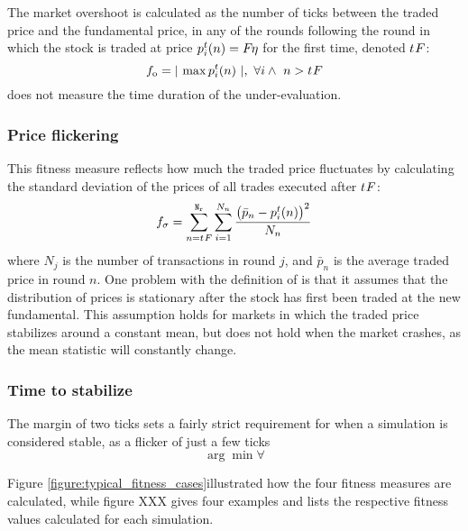 The market overshoot is calculated as the number of ticks between the traded price and the fundamental price, in any of the rounds following the round in which the stock is traded at price $\tradeprice{n}{i} = \fundamentalprice{\eta}$ for the first time, denoted $\round{F}$: 
\begin{equation}\label{eq:overshoot}
\overshoot = \lvert\ \max \tradeprice{n}{i}\ \rvert, \ \forall i \wedge \ n > \round{F}
\end{equation}
\overshoot{} does not measure the time duration of the under-evaluation. 

\subsubsection{Price flickering}
This fitness measure reflects how much the traded price fluctuates by calculating the standard deviation of the prices of all trades executed after $\round{F}$:
\begin{equation}\label{eq:stdev}
\stdev = \sum\limits_{n = \round{F}}^{\nrounds}  \sum\limits_{i=1}^{N_n} \frac{\big(\bar{p}_n - \tradeprice{n}{i}\big)^2}{N_n}
\end{equation}
where $N_j$ is the number of transactions in round $j$, and $\bar{p}_n$ is the average traded price in round $n$. One problem with the definition of \stdev{} is that it assumes that the distribution of prices is stationary after the stock has first been traded at the new fundamental. This assumption holds for markets in which the traded price stabilizes around a constant mean, but does not hold when the market crashes, as the mean statistic will constantly change.

\subsubsection{Time to stabilize}
The margin of two ticks sets a fairly strict requirement for when a simulation is considered stable, as a flicker of just a few ticks 
\begin{equation}\label{eq:roundstable}
\arg \min \forall 
\end{equation}

Figure \ref{figure:typical_fitness_cases}illustrated how the four fitness measures are calculated, while figure XXX gives four examples and lists the respective fitness values calculated for each simulation.


